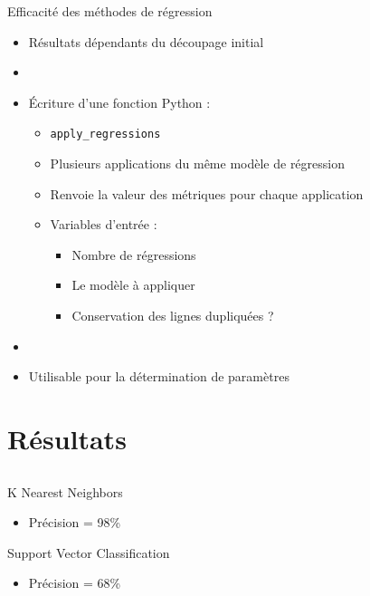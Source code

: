 \documentclass{beamer}
\begin{document}
\begin{frame}{Efficacité des méthodes de régression}
  \begin{itemize}
    \item Résultats dépendants du découpage initial
    \item[]
    \item \'Ecriture d'une fonction Python :
    \begin{itemize}
      \item \texttt{apply\_regressions}
      \item Plusieurs applications du même modèle de régression
      \item Renvoie la valeur des métriques pour chaque application
      \item Variables d'entrée :
      \begin{itemize}
        \item Nombre de régressions
        \item Le modèle à appliquer
        \item Conservation des lignes dupliquées ?
      \end{itemize}
    \end{itemize}
    \item[]
    \item Utilisable pour la détermination de paramètres
  \end{itemize}
\end{frame}

\section{Résultats}

\subsection*{}

\begin{frame}{K Nearest Neighbors}
  \begin{center}
  \end{center}
  \begin{itemize}
    \item Précision = 98\%
  \end{itemize}
\end{frame}

\begin{frame}{Support Vector Classification}
  \begin{center}
  \end{center}
  \begin{itemize}
    \item Précision = 68\%
  \end{itemize}
\end{frame}
\end{document}
